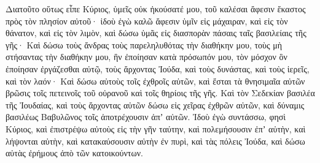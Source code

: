 {\par }{\PP {}Διατοῦτο οὕτως εἶπε Κύριος, ὑμεῖς οὐκ ἠκούσατέ μου, τοῦ καλέσαι ἄφεσιν ἕκαστος πρὸς τὸν πλησίον αὐτοῦ· ἰδοὺ ἐγὼ καλῶ ἄφεσιν ὑμῖν εἰς μάχαιραν, καὶ εἰς τὸν θάνατον, καὶ εἰς τὸν λιμὸν, καὶ δώσω ὑμᾶς εἰς διασπορὰν πάσαις ταῖς βασιλείαις τῆς γῆς·
Καὶ δώσω τοὺς ἄνδρας τοὺς παρεληλυθότας τὴν διαθήκην μου, τοὺς μὴ στήσαντας τὴν διαθήκην μου, ἣν ἐποίησαν κατὰ πρόσωπόν μου, τὸν μόσχον ὃν ἐποίησαν ἐργάζεσθαι αὐτῷ,
τοὺς ἄρχοντας Ἰούδα, καὶ τοὺς δυνάστας, καὶ τοὺς ἱερεῖς, καὶ τὸν λαόν·
Καὶ δώσω αὐτοὺς τοῖς ἐχθροῖς αὐτῶν, καὶ ἔσται τὰ θνησιμαῖα αὐτῶν βρῶσις τοῖς πετεινοῖς τοῦ οὐρανοῦ καὶ τοῖς θηρίοις τῆς γῆς.
Καὶ τὸν Σεδεκίαν βασιλέα τῆς Ἰουδαίας, καὶ τοὺς ἄρχοντας αὐτῶν δώσω εἰς χεῖρας ἐχθρῶν αὐτῶν, καὶ δύναμις βασιλέως Βαβυλῶνος τοῖς ἀποτρέχουσιν ἀπʼ αὐτῶν.
Ἰδοὺ ἐγὼ συντάσσω, φησὶ Κύριος, καὶ ἐπιστρέψω αὐτοὺς εἰς τὴν γῆν ταύτην, καὶ πολεμήσουσιν ἐπʼ αὐτὴν, καὶ λήψονται αὐτὴν, καὶ κατακαύσουσιν αὐτὴν ἐν πυρὶ, καὶ τὰς πόλεις Ἰούδα, καὶ δώσω αὐτὰς ἐρήμους ἀπὸ τῶν κατοικούντων.

}
